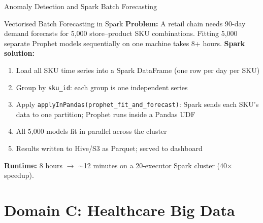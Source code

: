\documentclass[aspectratio=169,10pt]{beamer}
\begin{document}
\begin{frame}{Anomaly Detection and Spark Batch Forecasting}
   
      \begin{exampleblock}{Vectorised Batch Forecasting in Spark}
        \small \textbf{Problem:} A retail chain needs 90-day demand forecasts for 5{,}000 store--product SKU combinations.  Fitting 5{,}000 separate Prophet models sequentially on one machine takes 8+ hours.
        \vspace{4pt}
        \textbf{Spark solution:}
        \begin{enumerate}
          \item Load all SKU time series into a Spark DataFrame (one row per day per SKU)
          \item Group by \texttt{sku\_id}: each group is one independent series
          \item Apply \texttt{applyInPandas(prophet\_fit\_and\_forecast)}: Spark sends each SKU's data to one partition; Prophet runs inside a Pandas UDF
          \item All 5{,}000 models fit in parallel across the cluster
          \item Results written to Hive/S3 as Parquet; served to dashboard
        \end{enumerate}
        \vspace{4pt}
        \textbf{Runtime:} 8 hours $\to$ $\sim$12 minutes on a 20-executor Spark cluster (40$\times$ speedup).
      \end{exampleblock}
  
\end{frame}
\section{Domain C: Healthcare Big Data}
\end{document}
